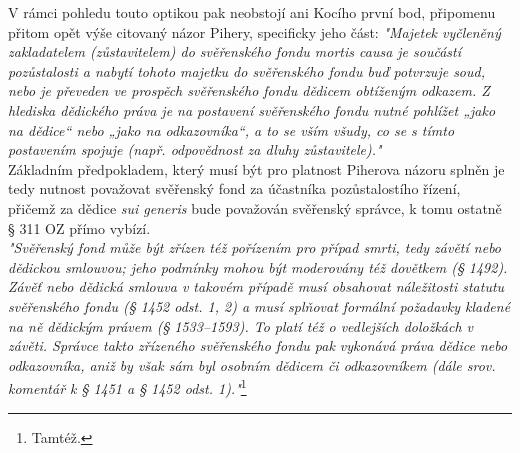 \documentclass{article}
\begin{document}
 V rámci pohledu touto optikou pak neobstojí ani Kocího první bod, připomenu přitom opět výše citovaný názor Pihery, specificky jeho část: \textit{"Majetek vyčleněný zakladatelem (zůstavitelem) do svěřenského fondu mortis causa je součástí pozůstalosti a nabytí tohoto majetku do svěřenského fondu buď potvrzuje soud, nebo je převeden ve prospěch svěřenského fondu dědicem obtíženým odkazem. Z hlediska dědického práva je na postavení svěřenského fondu nutné pohlížet „jako na dědice“ nebo „jako na odkazovníka“, a to se vším všudy, co se s tímto postavením spojuje (např. odpovědnost za dluhy zůstavitele)."}\\

 
 Základním předpokladem, který musí být pro platnost Piherova názoru splněn je tedy nutnost považovat svěřenský fond za účastníka pozůstalostího řízení, přičemž za dědice \textit{sui generis} bude považován svěřenský správce, k tomu ostatně § 311 OZ přímo vybízí.\\
 
 \textit{"Svěřenský fond může být zřízen též pořízením pro případ smrti, tedy závětí nebo dědickou smlouvou; jeho podmínky mohou být moderovány též dovětkem (§ 1492). Závěť nebo dědická smlouva v takovém případě musí obsahovat náležitosti statutu svěřenského fondu (§ 1452 odst. 1, 2) a musí splňovat formální požadavky kladené na ně dědickým právem (§ 1533–1593). To platí též o vedlejších doložkách v závěti. Správce takto zřízeného svěřenského fondu pak vykonává práva dědice nebo odkazovníka, aniž by však sám byl osobním dědicem či odkazovníkem (dále srov. komentář k § 1451 a § 1452 odst. 1)."}\footnote{Tamtéž.}\\
 
\end{document}
